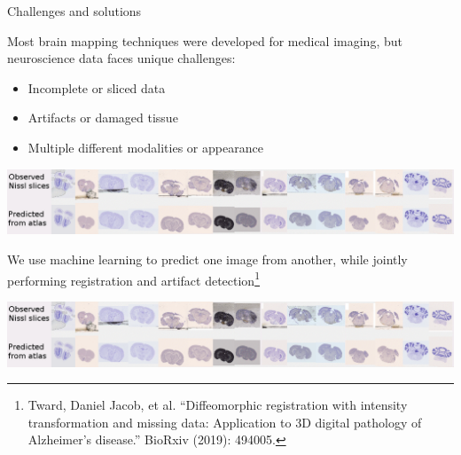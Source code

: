\documentclass{beamer}
\begin{document}
\begin{frame}{Challenges and solutions}

Most brain mapping techniques were developed for medical imaging, but  neuroscience data faces unique challenges:


\begin{itemize}


\item 
Incomplete or sliced data

\item 
Artifacts or damaged tissue

\item 
Multiple different modalities or appearance

\end{itemize}

\includegraphics[width=\textwidth,clip,trim=0in 1.3in 0in 0in]{720exampleslices-edit}

\vspace{1em}

We use machine learning to predict one image from another, while \alert{jointly} performing registration and artifact detection\footnote{ Tward, Daniel Jacob, et al. ``Diffeomorphic registration with intensity transformation and missing data: Application to 3D digital pathology of Alzheimer's disease.'' BioRxiv (2019): 494005.}

\vspace{1em}
\includegraphics[width=\textwidth,clip,trim=0in 0in 0in 1.3in]{720exampleslices-edit}


\end{frame}
\end{document}
